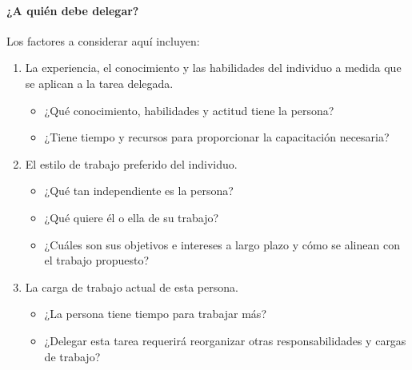 \documentclass[10pt]{book}
\begin{document}
\paragraph{¿A quién debe delegar?} Los factores a considerar aquí incluyen:
\begin{enumerate}[\bfseries 1.]
\item La experiencia, el conocimiento y las habilidades del individuo a medida que se aplican a la tarea delegada.
\begin{itemize}
\item ¿Qué conocimiento, habilidades y actitud tiene la persona?
\item ¿Tiene tiempo y recursos para proporcionar la capacitación necesaria?     
\end{itemize}
\item El estilo de trabajo preferido del individuo.
\begin{itemize}
\item ¿Qué tan independiente es la persona?
\item ¿Qué quiere él o ella de su trabajo?
\item ¿Cuáles son sus objetivos e intereses a largo plazo y cómo se alinean con el trabajo propuesto?
\end{itemize}
\item La carga de trabajo actual de esta persona.
\begin{itemize}
\item ¿La persona tiene tiempo para trabajar más?
\item ¿Delegar esta tarea requerirá reorganizar otras responsabilidades y cargas de trabajo?
\end{itemize}
\end{enumerate}
\end{document}
